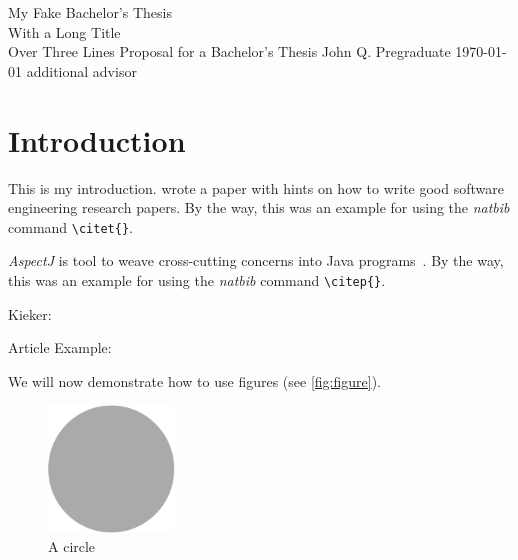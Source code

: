 

\usepackage{pgfgantt}

\usepackage{rotating}

\hypersetup{pdftitle=My Fake Bachelor's Thesis with a Long Title over Three Lines}
\hypersetup{pdfauthor=John Q. Pregraduate}
\hypersetup{pdfsubject=Proposal for a Bachelor's Thesis}
\hypersetup{pdfkeywords=}


\frontmatter
  \thesistitlepage
    {My Fake Bachelor's Thesis \\[.1em]With a Long Title \\[.1em]Over Three Lines}%
    {Proposal for a Bachelor's Thesis}%
    {John Q. Pregraduate}%
    {\today}%
    {additional advisor} %

  \tableofcontents{}

\mainmatter


\chapter{Introduction}\label{chp:Introduction}
  This is my introduction.
  \citet{Shaw2003} wrote a paper with hints on how to write good software engineering research papers.
  By the way, this was an example for using the \textit{natbib} command \texttt{\textbackslash{}citet\{\}}.
  
  \textit{AspectJ} is tool to weave cross-cutting concerns into Java programs~\citep{AspectJ}. By the way, this was an example for using the \textit{natbib} command \texttt{\textbackslash{}citep\{\}}.
  
  Kieker: \citep{Rohr2008, Hoorn2009, Hoorn2012}
  
  Article Example: \citep{Frey2011}
  
  We will now demonstrate how to use figures (see \autoref{fig:figure}).
  
  \begin{figure}[t]%
    \centering%
    \includegraphics[width=0.3\textwidth]{img/template_circle.pdf}%
    \caption{A circle}%
    \label{fig:figure}%
  \end{figure}%

